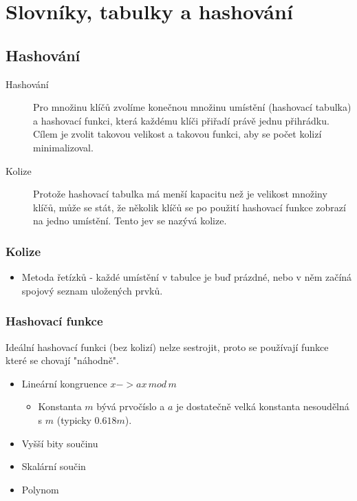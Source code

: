 \section{Slovníky, tabulky a hashování}
  \subsection{Hashování}
    \begin{description}
      \item[Hashování] Pro množinu klíčů zvolíme konečnou množinu umístění (hashovací tabulka) a hashovací funkci, která každému klíči přiřadí právě jednu přihrádku.
      Cílem je zvolit takovou velikost a takovou funkci, aby se počet kolizí minimalizoval.
      \item[Kolize] Protože hashovací tabulka má menší kapacitu než je velikost množiny klíčů, může se stát, že několik klíčů se po použití hashovací funkce zobrazí na jedno umístění.
      Tento jev se nazývá kolize.
    \end{description}

    \subsubsection{Kolize}
      \begin{itemize}
        \item Metoda řetízků - každé umístění v tabulce je buď prázdné, nebo v něm začíná spojový seznam uložených prvků.
      \end{itemize}

    \subsubsection{Hashovací funkce}
      Ideální hashovací funkci (bez kolizí) nelze sestrojit, proto se používají funkce které se chovají "náhodně".
      \begin{itemize}
        \item Lineární kongruence $x -> ax \, mod \, m$
          \begin{itemize}
            \item Konstanta $m$ bývá prvočíslo a $a$ je dostatečně velká konstanta nesoudělná s $m$ (typicky $0.618m$).
          \end{itemize}
        \item Vyšší bity součinu
        \item Skalární součin
        \item Polynom
      \end{itemize}

